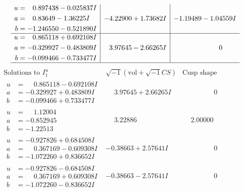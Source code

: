 \documentclass[1p]{elsarticle_modified}
\theoremstyle{definition}
\newcommand{\I}{\sqrt{-1}}
\begin{document}
$$\begin{array}{c|c|c}
\begin{aligned}
u &= \phantom{-}0.897438 - 0.025837 I \\
a &= \phantom{-}0.83649 - 1.36225 I \\
b &= -1.246550 - 0.521890 I\end{aligned}
 & -4.22900 + 1.73682 I & -1.19489 - 1.04559 I \\ \hline\begin{aligned}
u &= \phantom{-}0.865118 + 0.692108 I \\
a &= -0.329927 - 0.483809 I \\
b &= -0.099466 - 0.733477 I\end{aligned}
 & \phantom{-}3.97645 - 2.66265 I & \phantom{-0.000000 } 0\\
 \hline 
 \end{array}$$\newpage$$\begin{array}{c|c|c}  
\text{Solutions to }I^u_{1}& \I (\text{vol} + \sqrt{-1}CS) & \text{Cusp shape}\\
 \hline 
\begin{aligned}
u &= \phantom{-}0.865118 - 0.692108 I \\
a &= -0.329927 + 0.483809 I \\
b &= -0.099466 + 0.733477 I\end{aligned}
 & \phantom{-}3.97645 + 2.66265 I & \phantom{-0.000000 } 0 \\ \hline\begin{aligned}
u &= \phantom{-}1.12004\phantom{ +0.000000I} \\
a &= -0.852945\phantom{ +0.000000I} \\
b &= -1.22513\phantom{ +0.000000I}\end{aligned}
 & \phantom{-}3.22886\phantom{ +0.000000I} & \phantom{-}2.00000\phantom{ +0.000000I} \\ \hline\begin{aligned}
u &= -0.927826 + 0.684508 I \\
a &= \phantom{-}0.367169 - 0.609308 I \\
b &= -1.072260 + 0.836652 I\end{aligned}
 & -0.38663 + 2.57641 I & \phantom{-0.000000 } 0 \\ \hline\begin{aligned}
u &= -0.927826 - 0.684508 I \\
a &= \phantom{-}0.367169 + 0.609308 I \\
b &= -1.072260 - 0.836652 I\end{aligned}
 & -0.38663 - 2.57641 I & \phantom{-0.000000 } 0 \\ \hline\begin{aligned}

\end{aligned}
\end{array}$$
\end{document}
